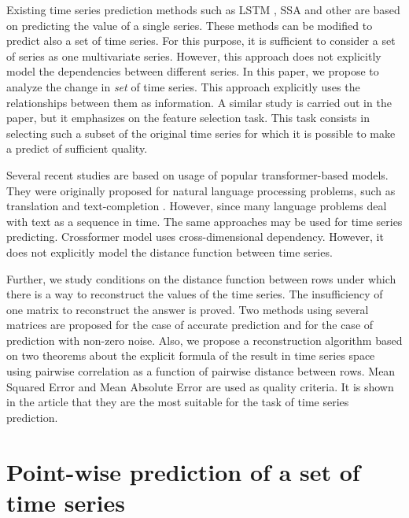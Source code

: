 \documentclass[12pt]{article}
\begin{document}
	Existing time series prediction methods such as LSTM \cite{LSTM}, SSA \cite{SSA} and other \cite{Biosignals, boyd2017multiperiod} are based on predicting the value of a single series. These methods can be modified to predict also a set of time series. For this purpose, it is sufficient to consider a set of series as one multivariate series. However, this approach does not explicitly model the dependencies between different series. In this paper, we propose to analyze the change in \emph{set} of time series. This approach explicitly uses the relationships between them as information. A similar study is carried out in the \cite{MulticorrelatedQuadratic} paper, but it emphasizes on the feature selection task. This task consists in selecting such a subset of the original time series for which it is possible to make a predict of sufficient quality.
	
	Several recent studies \cite{haoyietal-informer-2021,haoyietal-informerEx-2023,wu2021autoformer,liu2022pyraformer} are based on usage of popular transformer-based models. They were originally proposed for natural language processing problems, such as translation and text-completion \cite{NIPS2017_3f5ee243}. However, since many language problems deal with text as a sequence in time. The same approaches may be used for time series predicting. Crossformer \cite{zhang2023crossformer} model uses cross-dimensional dependency.  However, it does not explicitly model the distance function between time series.
	
	Further, we study conditions on the distance function between rows under which there is a way to reconstruct the values of the time series. The insufficiency of one matrix to reconstruct the answer is proved. Two methods using several matrices are proposed for the case of accurate prediction and for the case of prediction with non-zero noise. Also, we propose a reconstruction algorithm based on two theorems about the explicit formula of the result in time series space using pairwise correlation as a function of pairwise distance between rows. Mean Squared Error and Mean Absolute Error are used as quality criteria. It is shown in the article \cite{jadon2022comprehensive} that they are the most suitable for the task of time series prediction.

\section{Point-wise prediction of a set of time series}
\end{document}
